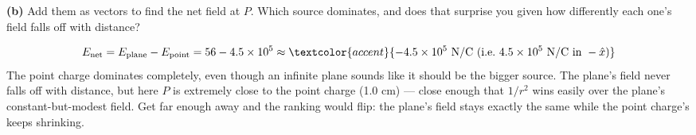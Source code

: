 \documentclass[12pt]{article}
\newcommand{\ANS}[1]{\textcolor{accent}{#1}}
\begin{document}
\textbf{(b)} Add them as vectors to find the net field at $P$. Which source
dominates, and does that surprise you given how differently each one's field falls
off with distance?

\[
E_{\text{net}} = E_{\text{plane}}-E_{\text{point}} = 56 - 4.5\times10^{5}
\approx \ANS{-4.5\times10^{5}\text{ N/C (i.e.\ } 4.5\times10^5\text{ N/C in }-\hat x\text{)}}
\]
\ANS{The point charge dominates completely}, even though an infinite plane sounds
like it should be the bigger source. The plane's field never falls off with
distance, but here $P$ is extremely close to the point charge (1.0 cm) --- close
enough that $1/r^2$ wins easily over the plane's constant-but-modest field. Get far
enough away and the ranking would flip: the plane's field stays exactly the same
while the point charge's keeps shrinking.
\end{document}
